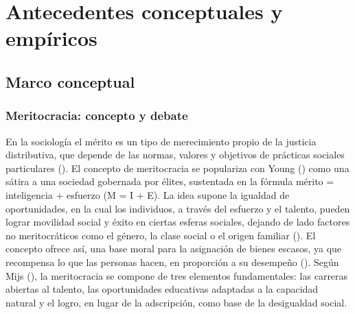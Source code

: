 \documentclass[
  spanish,
  a4paper,
  oneside]{scrbook}
\begin{document}

\chapter{Antecedentes conceptuales y
empíricos}\label{antecedentes-conceptuales-y-empuxedricos}

\section{Marco conceptual}\label{marco-conceptual-1}

\subsection{Meritocracia: concepto y
debate}\label{meritocracia-concepto-y-debate-1}

En la sociología el mérito es un tipo de merecimiento propio de la
justicia distributiva, que depende de las normas, valores y objetivos de
prácticas sociales particulares (). El concepto de meritocracia se populariza con Young
() como una sátira a una sociedad
gobernada por élites, sustentada en la fórmula mérito = inteligencia +
esfuerzo (M = I + E). La idea supone la igualdad de oportunidades, en la
cual los individuos, a través del esfuerzo y el talento, pueden lograr
movilidad social y éxito en ciertas esferas sociales, dejando de lado
factores no meritocráticos como el género, la clase social o el origen
familiar ().
El concepto ofrece así, una base moral para la asignación de bienes
escasos, ya que recompensa lo que las personas hacen, en proporción a su
desempeño (). Según
Mijs (), la meritocracia se
compone de tres elementos fundamentales: las carreras abiertas al
talento, las oportunidades educativas adaptadas a la capacidad natural y
el logro, en lugar de la adscripción, como base de la desigualdad
social.
\end{document}
